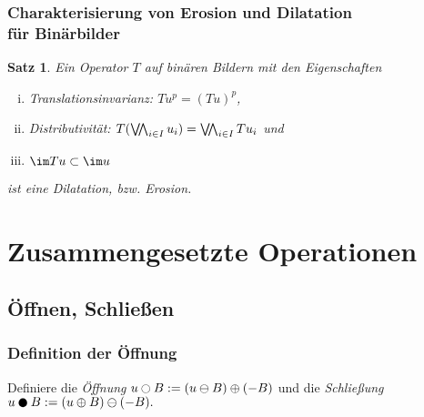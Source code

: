 \documentclass{beamer}
\newtheorem{satz}[theorem]{Satz}
\begin{document}
\begin{frame}
    \frametitle{Charakterisierung von Erosion und Dilatation\\ für Binärbilder}
    \begin{satz}
        Ein Operator $T$ auf binären Bildern mit den Eigenschaften
        \begin{enumerate}[i)]
            \item
                Translationsinvarianz: $Tu^p = (Tu)^p$,
            \item
                Distributivität: $T (\bigveewedge_{i\in I} u_i) = \bigveewedge_{i \in I} T u_i$ und
            \item
                $\im Tu \subset \im u$
        \end{enumerate}
        ist eine Dilatation, bzw. Erosion.
    \end{satz}
\end{frame}


\section{Zusammengesetzte Operationen}

\subsection{Öffnen, Schließen}

\begin{frame}
    \frametitle{Definition der Öffnung}
    \begin{definition}
        Definiere
        die \emph{Öffnung}
        \begin{math}
            u \open B := (u \erode B) \dilate (-B)
        \end{math}
        und die \emph{Schließung}
        \begin{math}
            u \close B := (u \dilate B) \erode (-B).
        \end{math}
    \end{definition}
\end{frame}
\end{document}
